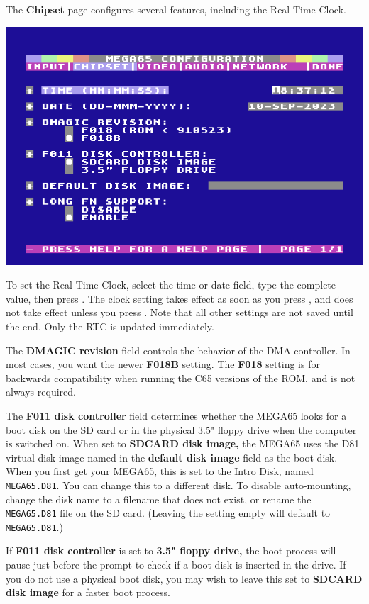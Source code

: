 The {\bf Chipset} page configures several features, including the Real-Time Clock.

\begin{center}
  \includegraphics[width=0.7\linewidth]{images/ss-m65config-2.png}
\end{center}

To set the Real-Time Clock, select the time or date field, type the complete value, then press . The clock setting takes effect as soon as you press , and does not take effect unless you press . Note that all other settings are not saved until the end. Only the RTC is updated immediately.

The {\bf DMAGIC revision} field controls the behavior of the DMA controller. In most cases, you want the newer {\bf F018B} setting. The {\bf F018} setting is for backwards compatibility when running the C65 versions of the ROM, and is not always required.

The {\bf F011 disk controller} field determines whether the MEGA65 looks for a boot disk on the SD card or in the physical 3.5" floppy drive when the computer is switched on. When set to {\bf SDCARD disk image,} the MEGA65 uses the D81 virtual disk image named in the {\bf default disk image} field as the boot disk. When you first get your MEGA65, this is set to the Intro Disk, named {\tt MEGA65.D81}. You can change this to a different disk. To disable auto-mounting, change the disk name to a filename that does not exist, or rename the {\tt MEGA65.D81} file on the SD card. (Leaving the setting empty will default to {\tt MEGA65.D81}.)

If {\bf F011 disk controller} is set to {\bf 3.5" floppy drive,} the boot process will pause just before the  prompt to check if a boot disk is inserted in the drive. If you do not use a physical boot disk, you may wish to leave this set to {\bf SDCARD disk image} for a faster boot process.

